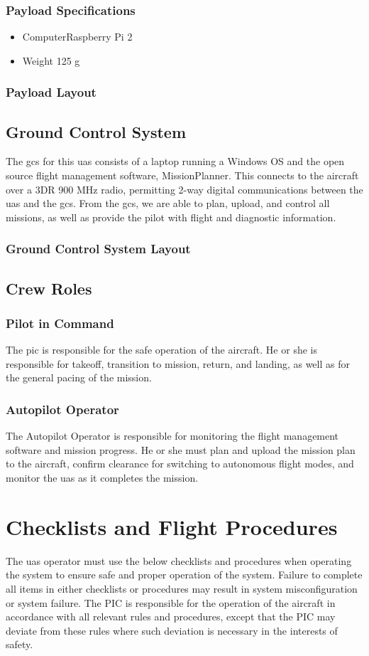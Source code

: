 \documentclass{report}
\begin{document}
		\subsection{Payload Specifications}
			\begin{itemize}
				\item Computer\hfill Raspberry Pi 2
				\item Weight \hfill 125 g
			\end{itemize}
		\subsection{Payload Layout}
	\section{Ground Control System}
		The \gls{gcs} for this \gls{uas} consists of a laptop running a Windows OS and the open source flight management software, MissionPlanner.  This connects to the aircraft over a 3DR 900 MHz radio, permitting 2-way digital communications between the \gls{uas} and the \gls{gcs}.  From the \gls{gcs}, we are able to plan, upload, and control all missions, as well as provide the pilot with flight and diagnostic information.
		\subsection{Ground Control System Layout}
	\section{Crew Roles}
		\subsection{Pilot in Command}
			The \gls{pic} is responsible for the safe operation of the aircraft.  He or she is responsible for takeoff, transition to mission, return, and landing, as well as for the general pacing of the mission.
		\subsection{Autopilot Operator}
			The Autopilot Operator is responsible for monitoring the flight management software and mission progress.  He or she must plan and upload the mission plan to the aircraft, confirm clearance for switching to autonomous flight modes, and monitor the \gls{uas} as it completes the mission.
\chapter{Checklists and Flight Procedures}
	The \gls{uas} operator must use the below checklists and procedures when operating the system to ensure safe and proper operation of the system.  Failure to complete all items in either checklists or procedures may result in system misconfiguration or system failure.  The PIC is responsible for the operation of the aircraft in accordance with all relevant rules and procedures, except that the PIC may deviate from these rules where such deviation is necessary in the interests of safety.
\end{document}
